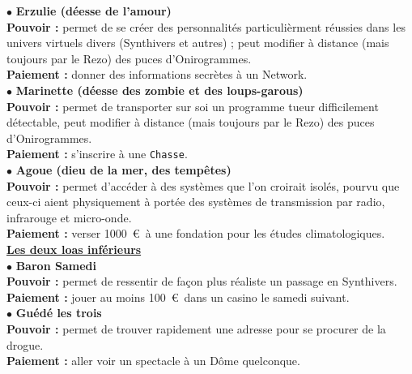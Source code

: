 \documentclass[11pt,twoside,a4paper]{article}
\begin{document}
\begin{multicols}{2}
{	$\bullet$ \textbf{Erzulie (d{\'e}esse de l'amour)}~\\
	\textbf{Pouvoir : } permet de se cr{\'e}er des personnalit{\'e}s particuli{\`e}rment r{\'e}ussies dans les univers virtuels divers (Synthivers et autres) ; peut modifier {\`a} distance (mais toujours par le Rezo) des puces d'Onirogrammes. ~\\ 
	\textbf{Paiement : } donner des informations secr{\`e}tes {\`a} un Network. ~\\
	$\bullet$ \textbf{Marinette (d{\'e}esse des zombie et des loups-garous)}~\\
	\textbf{Pouvoir : } permet de transporter sur soi un programme tueur difficilement d{\'e}tectable, peut modifier {\`a} distance (mais toujours par le Rezo) des puces d'Onirogrammes. ~\\ 
	\textbf{Paiement : } s'inscrire {\`a} une \texttt{Chasse}. ~\\
	$\bullet$ \textbf{Agoue (dieu de la mer, des temp{\^e}tes)}~\\
	\textbf{Pouvoir : } permet d'acc{\'e}der {\`a} des syst{\`e}mes que l'on croirait isol{\'e}s, pourvu que ceux-ci aient physiquement {\`a} port{\'e}e des syst{\`e}mes de transmission par radio, infrarouge et micro-onde. ~\\ 
	\textbf{Paiement : } verser 1000~\euro ~{\`a} une fondation pour les {\'e}tudes climatologiques. ~\\
	
	\textbf{\underline{Les deux loas inf{\'e}rieurs}}~\\ %
	$\bullet$ \textbf{Baron Samedi}~\\
	\textbf{Pouvoir : } permet de ressentir de fa\c{c}on plus r{\'e}aliste un passage en Synthivers. ~\\ 
	\textbf{Paiement : } jouer au moins 100~\euro ~dans un casino le samedi suivant. ~\\
	$\bullet$ \textbf{Gu{\'e}d{\'e} les trois}~\\
	\textbf{Pouvoir : } permet de trouver rapidement une adresse pour se procurer de la drogue. ~\\ 
	\textbf{Paiement : } aller voir un spectacle {\`a} un D{\^o}me quelconque. ~\\
	
	\vfill
	\columnbreak
	
}
\end{multicols}
\end{document}
